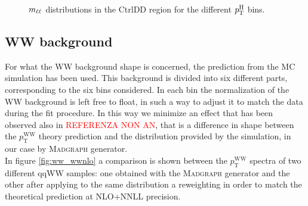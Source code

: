 \begin{figure}[htb]
\caption{$m_{\ell\ell}$ distributions in the CtrlDD region for the different $p_\mathrm{T}^\mathrm{H}$ bins.\label{fig:mllCtrlDD}}
\end{figure}

























\clearpage
\subsection{WW background \label{sec:WWBackground}}

For what the WW background shape is concerned, the prediction from the MC simulation has been used.
This background is divided into six different parts, corresponding to the six \pth bins considered. In each bin the normalization of the WW background is left free to float, in such a way to adjust it to match the data during the fit procedure. In this way we minimize an effect that has been observed also in \cite{CMS_AN_2014_056} \textcolor{red}{REFERENZA NON AN}, that is a difference in shape between the $p_\mathrm{T}^\mathrm{WW}$ theory prediction and the distribution provided by the simulation, in our case by \textsc{Madgraph} generator.\\
In figure \ref{fig:ww_wwnlo} a comparison is shown between the $p_\mathrm{T}^\mathrm{WW}$ spectra of two different qqWW samples: one obtained with the \textsc{Madgraph} generator and the other after applying to the same distribution a reweighting in order to match the theoretical prediction at NLO+NNLL precision. 


